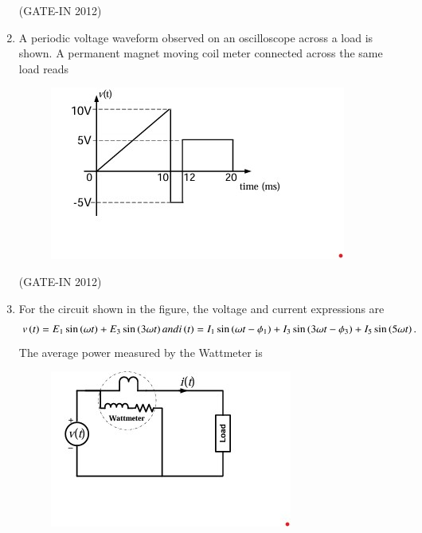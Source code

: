 \documentclass[journal,12pt,onecolumn]{IEEEtran}
\theoremstyle{remark}
\begin{document}
\begin{enumerate}
\hfill{(GATE-IN 2012)}
\begin{enumerate}
\end{enumerate}

\item A periodic voltage waveform observed on an oscilloscope across a load is shown. A permanent magnet moving coil  meter connected across the same load reads
\begin{figure}[H]
    \centering
    \includegraphics[width=0.6\columnwidth]{figs/a9.jpg}
    \caption*{}
    \label{fig:a9}
\end{figure}

\hfill{(GATE-IN 2012)}
\begin{enumerate}
\end{enumerate}

\item For the circuit shown in the figure, the voltage and current expressions are
\begin{align*}
v\left(t\right) = E_1 \sin\left(\omega t\right) + E_3 \sin\left(3\omega t\right) and i\left(t\right) = I_1 \sin\left(\omega t - \phi_1\right) + I_3 \sin\left(3\omega t - \phi_3\right) + I_5 \sin\left(5\omega t\right).
\end{align*}
The average power measured by the Wattmeter is
\begin{figure}[H]
    \centering
    \includegraphics[width=0.4\columnwidth]{figs/a10.jpg}
    \caption*{}
    \label{fig:a10}
\end{figure}


\end{enumerate}
\end{document}
